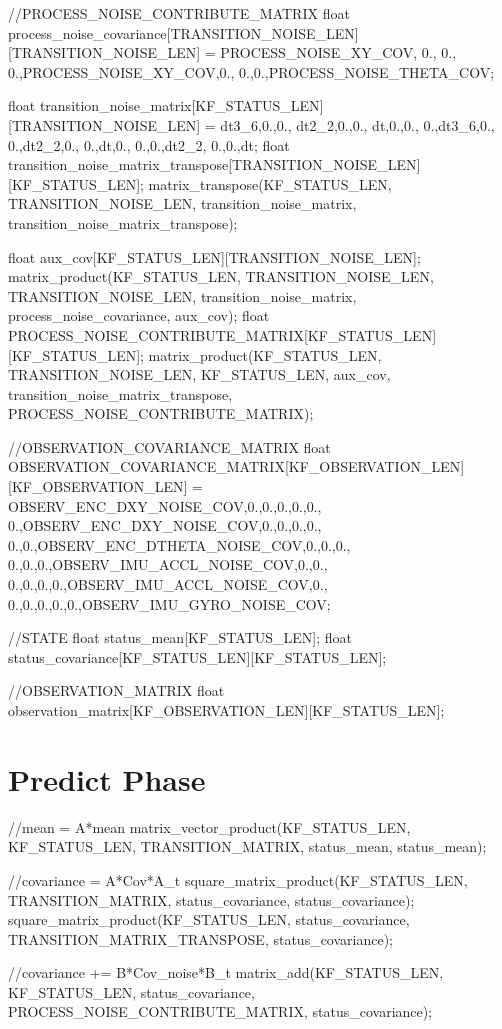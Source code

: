 \begin{ccode}
		//PROCESS_NOISE_CONTRIBUTE_MATRIX
	float process_noise_covariance[TRANSITION_NOISE_LEN][TRANSITION_NOISE_LEN] =
			{{PROCESS_NOISE_XY_COV, 0., 0.},
			{0.,PROCESS_NOISE_XY_COV,0.},
			{0.,0.,PROCESS_NOISE_THETA_COV}};
	
	float transition_noise_matrix[KF_STATUS_LEN][TRANSITION_NOISE_LEN] = 
			{{dt3_6,0.,0.},
			{dt2_2,0.,0.},
			{dt,0.,0.},
			{0.,dt3_6,0.},
			{0.,dt2_2,0.},
			{0.,dt,0.},
			{0.,0.,dt2_2},
			{0.,0.,dt}};
	float transition_noise_matrix_transpose[TRANSITION_NOISE_LEN][KF_STATUS_LEN];
	matrix_transpose(KF_STATUS_LEN, TRANSITION_NOISE_LEN, transition_noise_matrix, transition_noise_matrix_transpose);
	
	float aux_cov[KF_STATUS_LEN][TRANSITION_NOISE_LEN];
	matrix_product(KF_STATUS_LEN, TRANSITION_NOISE_LEN, TRANSITION_NOISE_LEN, transition_noise_matrix, process_noise_covariance, aux_cov);
	float PROCESS_NOISE_CONTRIBUTE_MATRIX[KF_STATUS_LEN][KF_STATUS_LEN];
	matrix_product(KF_STATUS_LEN, TRANSITION_NOISE_LEN, KF_STATUS_LEN, aux_cov, transition_noise_matrix_transpose, PROCESS_NOISE_CONTRIBUTE_MATRIX);
	
	
	//OBSERVATION_COVARIANCE_MATRIX
	float OBSERVATION_COVARIANCE_MATRIX[KF_OBSERVATION_LEN][KF_OBSERVATION_LEN] =
		{{OBSERV_ENC_DXY_NOISE_COV,0.,0.,0.,0.,0.},
		{0.,OBSERV_ENC_DXY_NOISE_COV,0.,0.,0.,0.},
		{0.,0.,OBSERV_ENC_DTHETA_NOISE_COV,0.,0.,0.},
		{0.,0.,0.,OBSERV_IMU_ACCL_NOISE_COV,0.,0.},
		{0.,0.,0.,0.,OBSERV_IMU_ACCL_NOISE_COV,0.},
		{0.,0.,0.,0.,0.,OBSERV_IMU_GYRO_NOISE_COV}};
\end{ccode}

\begin{ccode}
	//STATE
	float status_mean[KF_STATUS_LEN];
	float status_covariance[KF_STATUS_LEN][KF_STATUS_LEN];

	//OBSERVATION_MATRIX
	float observation_matrix[KF_OBSERVATION_LEN][KF_STATUS_LEN];
\end{ccode}

\section{Predict Phase}
\begin{ccode}
	//mean = A*mean
	matrix_vector_product(KF_STATUS_LEN, KF_STATUS_LEN, TRANSITION_MATRIX, status_mean, status_mean);
	
	//covariance = A*Cov*A_t
	square_matrix_product(KF_STATUS_LEN, TRANSITION_MATRIX, status_covariance, status_covariance);
	square_matrix_product(KF_STATUS_LEN, status_covariance, TRANSITION_MATRIX_TRANSPOSE, status_covariance);

	//covariance += B*Cov_noise*B_t
	matrix_add(KF_STATUS_LEN, KF_STATUS_LEN, status_covariance, PROCESS_NOISE_CONTRIBUTE_MATRIX, status_covariance);
\end{ccode}

